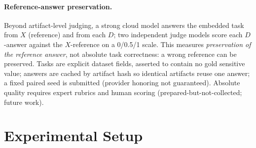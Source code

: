 \documentclass[11pt,a4paper]{article}
\begin{document}
\paragraph{Reference-answer preservation.} Beyond artifact-level judging, a strong cloud model answers the embedded task from $X$ (reference) and from each $D$; two independent judge models score each $D$-answer against the $X$-reference on a 0/0.5/1 scale. This measures \emph{preservation of the reference answer}, not absolute task correctness: a wrong reference can be preserved. Tasks are explicit dataset fields, asserted to contain no gold sensitive value; answers are cached by artifact hash so identical artifacts reuse one answer; a fixed paired seed is submitted (provider honoring not guaranteed). Absolute quality requires expert rubrics and human scoring (prepared-but-not-collected; future work).

\section{Experimental Setup}
\end{document}
